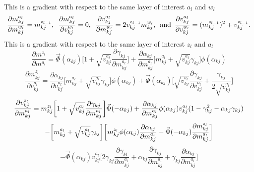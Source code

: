 \documentclass[]{article}
\begin{document}
This is a gradient with respect to the same layer of interest $a_l$ and $w_l$
\begin{equation}
	\frac{\partial m_{kj}^{a_l}}{\partial m_{kj}^{w_{l}}} = m_{kj}^{z_{l-1}}, \hspace{0.07in} \frac{\partial m_{kj}^{a_l}}{\partial v_{kj}^{w_{l}}} = 0, \hspace{0.07in} \frac{\partial v_{kj}^{a_l}}{\partial m_{kj}^{w_{l}}} = 2v_{kj}^{z_{l-1}}m_{kj}^{w_l}, \hspace{0.07in} \text{and} \hspace{0.07in} \frac{\partial v_{kj}^{a_l}}{\partial v_{kj}^{w_{l}}} = (m_{kj}^{z_{l-1}})^2 + v_{kj}^{z_{l-1}}.  
	\label{equ:79}
\end{equation}
This is a gradient with respect to the same layer of interest $z_l$ and $a_l$
\begin{equation}
	\frac{\partial m^{z_l}}{\partial m^{a_l}} = \vec{\Phi}(\alpha_{kj})\bigg[1+\sqrt{v_{kj}^{a_l}}\frac{\partial \gamma_{kj}}{\partial m_{kj}^{a_l}}\bigg] + \frac{\partial \alpha_{kj}}{\partial m_{kj}^{a_l}} \bigg[m_{kj}^{a_l}+\sqrt{v_{kj}^{a_l}}\gamma_{kj}\bigg] \phi(\alpha_{kj})
	\label{equ:80}
\end{equation}
\begin{equation}
	\frac{\partial m_{kj}^{z_l}}{\partial v_{kj}^{a_l}} = \frac{\partial \alpha_{kj}}{\partial v_{kj}^{a_l}} \bigg[m_{kj}^{a_l}+\sqrt{v_{kj}^{a_l}}\gamma_{kj}\bigg]\phi(\alpha_{kj}) + \vec{\Phi}(\alpha_{kj})\bigg[\sqrt{v_{kj}^{a_l}}\frac{\partial \gamma_{kj}}{\partial v_{kj}^{a_l}} + \frac{\gamma_{kj}}{2\sqrt{v_{kj}^{a_l}}}\bigg]
	\label{equ:81}
\end{equation}
\begin{equation}
	\frac{\partial v_{kj}^{z_l}}{\partial m_{kj}^{a_l}} = m_{kj}^{z_l}\bigg[1+\sqrt{v_{kj}^{a_l}}\frac{\partial \gamma_{kj}}{\partial m_{kj}^{a_l}}\bigg]\vec{\Phi}(-\alpha_{kj}) + \frac{\partial \alpha_{kj}}{\partial m_{kj}^{a_l}} \phi (\alpha_{kj}) v_{kj}^{a_l}(1-\gamma_{kj}^2 - \alpha_{kj}\gamma_{kj})
	\notag
\end{equation}
\begin{equation}
	-\bigg[m_{kj}^{a_l}+\sqrt{v_{kj}^{a_l}}\gamma_{kj}\bigg]\bigg[m_{kj}^{z_l}\phi(\alpha_{kj})\frac{\partial \alpha_{kj}}{\partial m_{kj}^{a_l}} - \vec{\Phi}(-\alpha_{kj}) \frac{\partial m_{kj}^{z_l}}{\partial m_{kj}^{a_l}}\bigg]
	\notag
\end{equation}
\begin{equation}
	- \vec{\Phi}(\alpha_{kj})v_{kj}^{a_l}\bigg[2\gamma_{kj}\frac{\partial \gamma_{kl}}{\partial m_{kj}^{a_l}} + \alpha_{kj}\frac{\partial \gamma_{kj}}{\partial m_{kj}^{a_l}} + \gamma_{kj}\frac{\partial \alpha_{kj}}{\partial m_{kj}^{a_l}}\bigg]
	\label{equ:82}
\end{equation}
\end{document}

